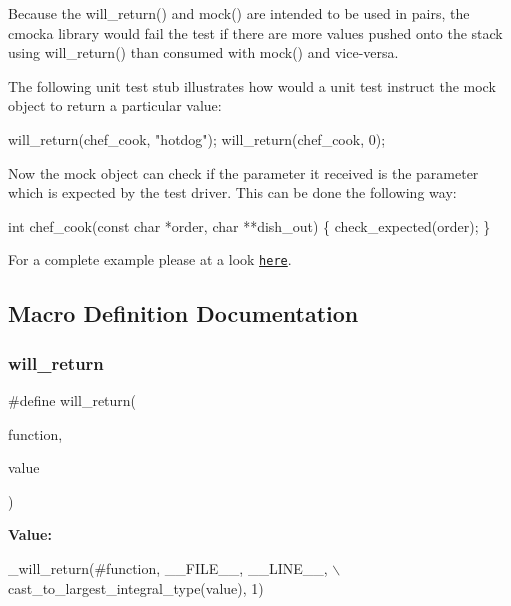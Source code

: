 Because the will\+\_\+return() and mock() are intended to be used in pairs, the cmocka library would fail the test if there are more values pushed onto the stack using will\+\_\+return() than consumed with mock() and vice-\/versa.

The following unit test stub illustrates how would a unit test instruct the mock object to return a particular value\+:


\begin{DoxyCode}
will\_return(chef\_cook, \textcolor{stringliteral}{"hotdog"});
will\_return(chef\_cook, 0);
\end{DoxyCode}


Now the mock object can check if the parameter it received is the parameter which is expected by the test driver. This can be done the following way\+:


\begin{DoxyCode}
\textcolor{keywordtype}{int} chef\_cook(\textcolor{keyword}{const} \textcolor{keywordtype}{char} *order, \textcolor{keywordtype}{char} **dish\_out)
\{
    check\_expected(order);
\}
\end{DoxyCode}


For a complete example please at a look \href{http://git.cryptomilk.org/projects/cmocka.git/tree/example/chef_wrap/waiter_test_wrap.c}{\tt here}. 

\subsection{Macro Definition Documentation}
\mbox{\label{group__cmocka__mock_ga30c27007b639ae66ec3bb8598f9526b9}} 
\subsubsection{\texorpdfstring{will\+\_\+return}{will\_return}}
{\footnotesize\ttfamily \#define will\+\_\+return(\begin{DoxyParamCaption}\item[{}]{function,  }\item[{}]{value }\end{DoxyParamCaption})}

{\bfseries Value\+:}
\begin{DoxyCode}
\_will\_return(#\textcolor{keyword}{function}, \_\_FILE\_\_, \_\_LINE\_\_, \(\backslash\)
                 cast\_to\_largest\_integral\_type(value), 1)
\end{DoxyCode}


